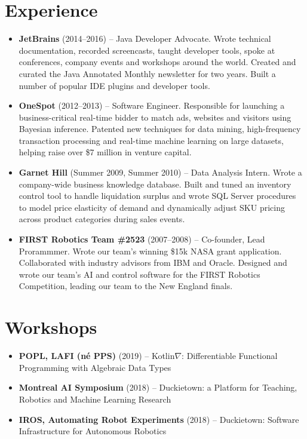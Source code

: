 \documentclass[letterpaper,11pt]{article}
\newcommand{\resumeItem}[2]{
\item\small{
\textbf{#1}{ #2 \vspace{-2pt}}
}
}
\newcommand{\resumeSubItem}[2]{\resumeItem{#1}{#2}\vspace{-4pt}}
\newcommand{\resumeSubHeadingListStart}{\begin{itemize}[leftmargin=*]}
\newcommand{\resumeSubHeadingListEnd}{\end{itemize}}
\begin{document}
\section{Experience}
\resumeSubHeadingListStart
\resumeSubItem{JetBrains}{(2014--2016) -- Java Developer Advocate. Wrote technical documentation, recorded screencasts, taught developer tools, spoke at conferences, company events and workshops around the world. Created and curated the Java Annotated Monthly newsletter for two years. Built a number of popular IDE plugins and developer tools.}
\resumeSubItem{OneSpot}{(2012--2013) -- Software Engineer. Responsible for launching a business-critical real-time bidder to match ads, websites and visitors using Bayesian inference. Patented new techniques for data mining, high-frequency transaction processing and real-time machine learning on large datasets, helping raise over \$7 million in venture capital.}
\resumeSubItem{Garnet Hill}{(Summer 2009, Summer 2010) -- Data Analysis Intern. Wrote a company-wide business knowledge database. Built and tuned an inventory control tool to handle liquidation surplus and wrote SQL Server procedures to model price elasticity of demand and dynamically adjust SKU pricing across product categories during sales events.}
\resumeSubItem{FIRST Robotics Team \#2523}{(2007--2008) -- Co-founder, Lead Prorammmer. Wrote our team's winning \$15k NASA grant application. Collaborated with industry advisors from IBM and Oracle. Designed and wrote our team's AI and control software for the FIRST Robotics Competition, leading our team to the New England finals.}
\resumeSubHeadingListEnd


\section{Workshops}
\resumeSubHeadingListStart
\resumeSubItem{POPL, LAFI (né PPS)}
    {(2019) -- Kotlin$\nabla$: Differentiable Functional Programming with Algebraic Data Types}
\resumeSubItem{Montreal AI Symposium}
{(2018) -- Duckietown: a Platform for Teaching, Robotics and Machine Learning Research}
\resumeSubItem{IROS, Automating Robot Experiments}
    {(2018) -- Duckietown: Software Infrastructure for Autonomous Robotics}
\resumeSubHeadingListEnd
\end{document}
